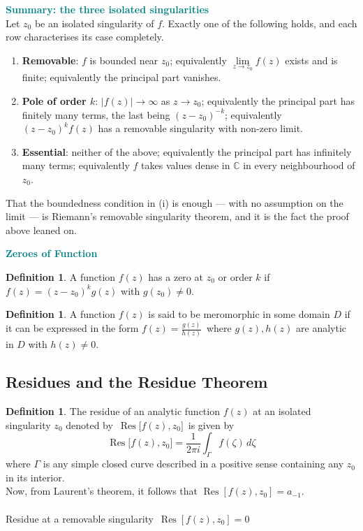 \documentclass[11pt,a4paper]{article}
\theoremstyle{definition}
\newtheorem{definition}[thm]{Definition}
\begin{document}
\textbf{\textcolor{teal}{Summary: the three isolated singularities}}\\
Let $z_0$ be an isolated singularity of $f$. Exactly one of the following holds,
and each row characterises its case completely.
\begin{enumerate}
\item[(i).] \textbf{Removable}: $f$ is bounded near $z_0$; equivalently
$\lim\limits_{z \rightarrow z_0} f(z)$ exists and is finite; equivalently the
principal part vanishes.
\item[(ii).] \textbf{Pole of order $k$}: $\left|f(z)\right| \rightarrow \infty$
as $z \rightarrow z_0$; equivalently the principal part has finitely many terms,
the last being $(z - z_0)^{-k}$; equivalently
$(z - z_0)^k f(z)$ has a removable singularity with non-zero limit.
\item[(iii).] \textbf{Essential}: neither of the above; equivalently the
principal part has infinitely many terms; equivalently $f$ takes values dense in
$\mathbb{C}$ in every neighbourhood of $z_0$.
\end{enumerate}
That the boundedness condition in (i) is enough --- with no assumption on the
limit --- is Riemann's removable singularity theorem, and it is the fact the
proof above leaned on.



\textbf{\textcolor{teal}{Zeroes of Function}}\\

\begin{definition}
A function $f(z)$ has a zero at $z_0$ or order $k$ if $f(z)  = (z - z_0)^kg(z)$ with $g(z_0)\neq 0$.
\end{definition}

\begin{definition}
A function $f(z)$ is said to be meromorphic in some domain $D$ if it can be expressed in the form $f(z)  = \frac{g(z)}{h(z)}\,$ where $g(z), h(z)$ are analytic in $D$ with $h(z)\neq 0$.
\end{definition}

{\color[wave]{485}\subsection{Residues and the Residue Theorem}}

\begin{definition}
The residue of an analytic function $f(z)$ at an isolated singularity  $z_0$ denoted by $\,\operatorname{Res}\big[f(z), z_0\big]\,$ is given by 
$$\operatorname{Res}\big[ f(z), z_0\big] = \frac{1}{2\pi i}\int_{\Gamma} f(\zeta)\,d\zeta$$
where $\Gamma$ is any simple closed curve described in a positive sense containing any $z_0$ in its interior.\\

Now, from Laurent's theorem, it follows that $\operatorname{Res}[f(z), z_0] = a_{-1}$.\\\\




Residue at a removable singularity $\,\operatorname{Res}[f(z), z_0] = 0$
\end{definition}
\end{document}
